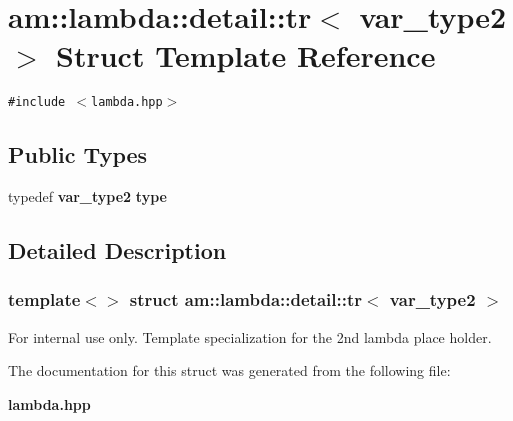 \section{am::lambda::detail::tr$<$ var\_\-type2 $>$ Struct Template Reference}
\label{structam_1_1lambda_1_1detail_1_1tr_3_01var__type2_01_4}
{\tt \#include $<$lambda.hpp$>$}

\subsection*{Public Types}
\begin{CompactItemize}
\item 
typedef {\bf var\_\-type2} \textbf{type}\label{structam_1_1lambda_1_1detail_1_1tr_3_01var__type2_01_4_c7796eb0140b1f516c2cae9fec615815}

\end{CompactItemize}


\subsection{Detailed Description}
\subsubsection*{template$<$$>$ struct am::lambda::detail::tr$<$ var\_\-type2 $>$}

\begin{Desc}
\item[For internal use only.]
Template specialization for the 2nd lambda place holder. \end{Desc}




The documentation for this struct was generated from the following file:\begin{CompactItemize}
\item 
{\bf lambda.hpp}\end{CompactItemize}
